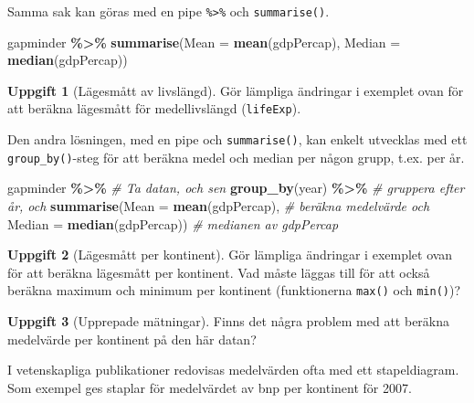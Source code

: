 \documentclass[
]{book}
\newenvironment{Shaded}{\begin{snugshade}}{\end{snugshade}}
\newcommand{\AttributeTok}[1]{\textcolor[rgb]{0.13,0.29,0.53}{#1}}
\newcommand{\CommentTok}[1]{\textcolor[rgb]{0.56,0.35,0.01}{\textit{#1}}}
\newcommand{\FunctionTok}[1]{\textcolor[rgb]{0.13,0.29,0.53}{\textbf{#1}}}
\newcommand{\NormalTok}[1]{#1}
\newcommand{\SpecialCharTok}[1]{\textcolor[rgb]{0.81,0.36,0.00}{\textbf{#1}}}
\theoremstyle{definition}
\theoremstyle{definition}
\theoremstyle{definition}
\newtheorem{exercise}{Uppgift}[chapter]
\theoremstyle{definition}
\theoremstyle{remark}
\begin{document}
Samma sak kan göras med en pipe \texttt{\%\textgreater{}\%} och \texttt{summarise()}.

\begin{Shaded}
\begin{Highlighting}[]
\NormalTok{gapminder }\SpecialCharTok{\%\textgreater{}\%}
  \FunctionTok{summarise}\NormalTok{(}\AttributeTok{Mean =} \FunctionTok{mean}\NormalTok{(gdpPercap),}
            \AttributeTok{Median =} \FunctionTok{median}\NormalTok{(gdpPercap))}
\end{Highlighting}
\end{Shaded}

\begin{exercise}[Lägesmått av livslängd]
Gör lämpliga ändringar i exemplet ovan för att beräkna lägesmått för medellivslängd (\texttt{lifeExp}).
\end{exercise}

Den andra lösningen, med en pipe och \texttt{summarise()}, kan enkelt utvecklas med ett \texttt{group\_by()}-steg för att beräkna medel och median per någon grupp, t.ex. per år.

\begin{Shaded}
\begin{Highlighting}[]
\NormalTok{gapminder }\SpecialCharTok{\%\textgreater{}\%}                           \CommentTok{\# Ta datan, och sen}
  \FunctionTok{group\_by}\NormalTok{(year) }\SpecialCharTok{\%\textgreater{}\%}                    \CommentTok{\# gruppera efter år, och}
  \FunctionTok{summarise}\NormalTok{(}\AttributeTok{Mean =} \FunctionTok{mean}\NormalTok{(gdpPercap),     }\CommentTok{\# beräkna medelvärde och}
            \AttributeTok{Median =} \FunctionTok{median}\NormalTok{(gdpPercap)) }\CommentTok{\# medianen av gdpPercap}
\end{Highlighting}
\end{Shaded}

\begin{exercise}[Lägesmått per kontinent]
Gör lämpliga ändringar i exemplet ovan för att beräkna lägesmått per kontinent. Vad måste läggas till för att också beräkna maximum och minimum per kontinent (funktionerna \texttt{max()} och \texttt{min()})?
\end{exercise}

\begin{exercise}[Upprepade mätningar]
Finns det några problem med att beräkna medelvärde per kontinent på den här datan?
\end{exercise}

I vetenskapliga publikationer redovisas medelvärden ofta med ett stapeldiagram. Som exempel ges staplar för medelvärdet av bnp per kontinent för 2007.
\end{document}
